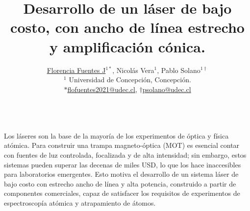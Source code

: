 \documentclass[11pt,spanish]{article}
\title{\vspace{-5mm}\fontsize{16pt}{10pt}\selectfont \textbf{Desarrollo de un láser de bajo costo, con ancho de línea estrecho y amplificación cónica.}} %
\author{
\normalsize \underline{Florencia Fuentes J$^{1*}$}, Nicolás Vera$^{1}$, Pablo Solano$^{1\dagger}$ \\
\vspace{-1mm}
\small $^1$ Universidad de Concepción, Concepción. \\
\small $*$\href{mailto:flofuentes2021@udec.cl}{flofuentes2021@udec.cl},
\quad
$\dagger$\href{mailto:psolano@udec.cl}{psolano@udec.cl}
}
\date{}
\newcommand{\seccion}[1]{\noindent {\Large\textbf{#1}}\\}
\begin{document}
\maketitle
\thispagestyle{fancy} %

\seccion{Resumen}
Los láseres son la base de la mayoría de los experimentos de óptica y física atómica. Para construir una trampa magneto-óptica (MOT) es esencial contar con fuentes de luz controlada, focalizada y de alta intensidad; sin embargo, estos sistemas pueden superar las decenas de miles USD, lo que los hace inaccesibles para laboratorios emergentes. Esto motiva el desarrollo de un sistema láser de bajo costo con estrecho ancho de línea y alta potencia, construido a partir de componentes comerciales, capaz de satisfacer los requisitos de experimentos de espectroscopía atómica y atrapamiento de átomos.
\end{document}
